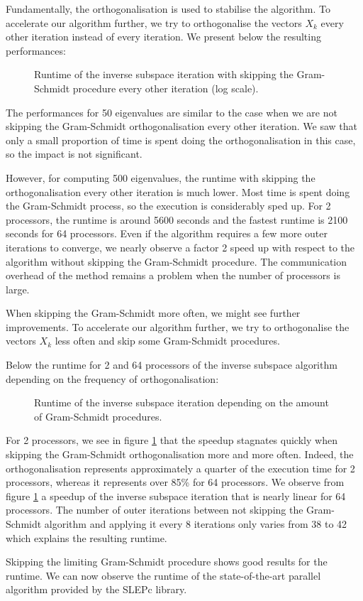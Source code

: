 Fundamentally, the orthogonalisation is used to stabilise the algorithm.
\ifthesis
 To accelerate our algorithm further, we try to orthogonalise the vectors \(X_k\) every other iteration instead of every iteration.
 We present below the resulting performances:

 \begin{figure}[H]
  \centering
  
  \caption{Runtime of the inverse subspace iteration with skipping the Gram-Schmidt procedure every other iteration (log scale).}
 \end{figure}

 The performances for 50 eigenvalues are similar to the case when we are not skipping the Gram-Schmidt orthogonalisation every other iteration.
 We saw that only a small proportion of time is spent doing the orthogonalisation in this case, so the impact is not significant.

 However, for computing 500 eigenvalues, the runtime with skipping the orthogonalisation every other iteration is much lower.
 Most time is spent doing the Gram-Schmidt process, so the execution is considerably sped up.
 For 2 processors, the runtime is around 5600 seconds and the fastest runtime is 2100 seconds for 64 processors.
 Even if the algorithm requires a few more outer iterations to converge, we nearly observe a factor 2 speed up with respect to the algorithm without skipping the Gram-Schmidt procedure.
 The communication overhead of the method remains a problem when the number of processors is large.

 When skipping the Gram-Schmidt more often, we might see further improvements.
\else
 To accelerate our algorithm further, we try to orthogonalise the vectors \(X_k\) less often and skip some Gram-Schmidt procedures.
\fi

Below the runtime for 2 and 64 processors of the inverse subspace algorithm depending on the frequency of orthogonalisation:

\begin{figure}[H]
 \centering
 
 \caption{Runtime of the inverse subspace iteration depending on the amount of Gram-Schmidt procedures.}
 \label{fig:skip_gs}
\end{figure}

For 2 processors, we see in figure \ref{fig:skip_gs} that the speedup stagnates quickly when skipping the Gram-Schmidt orthogonalisation more and more often.
Indeed, the orthogonalisation represents approximately a quarter of the execution time for 2 processors, whereas it represents over 85\% for 64 processors.
We observe from figure \ref{fig:skip_gs} a speedup of the inverse subspace iteration that is nearly linear for 64 processors.
The number of outer iterations between not skipping the Gram-Schmidt algorithm and applying it every 8 iterations only varies from 38 to 42 which explains the resulting runtime.

Skipping the limiting Gram-Schmidt procedure shows good results for the runtime.
We can now observe the runtime of the state-of-the-art parallel algorithm provided by the SLEPc library.
